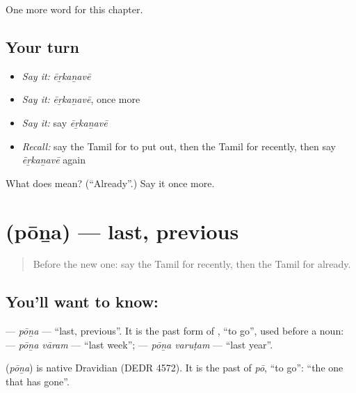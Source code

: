 \begin{grammarlens}[title={What you've built}]
One more word for this chapter.
\end{grammarlens}

\subsection*{Your turn}
\begin{itemize}
\raggedright
  \item \emph{Say it:} \emph{ēṟkaṉavē}
  \item \emph{Say it:} \emph{ēṟkaṉavē}, once more
  \item \emph{Say it:} say \emph{ēṟkaṉavē}
  \item \emph{Recall:} say the Tamil for to put out, then the Tamil for recently, then say \emph{ēṟkaṉavē} again
\end{itemize}

\begin{tcolorbox}[breakable,colback=teal!4,colframe=teal!35!black,title={Before you move on}]
What does  mean? (\textquotedblleft{}Already\textquotedblright{}.) Say it once more.
\end{tcolorbox}
\section[\texorpdfstring{\ta{போன} (pōṉa)}{போன (pōṉa)}]{ (pōṉa) — last, previous}

\label{lesson:TA-C158-pona}



\begin{quote}
Before the new one: say the Tamil for recently, then the Tamil for already.
\end{quote}

\subsection*{You'll want to know: }
\textbf{} — \emph{pōṉa} — \textquotedblleft{}last, previous\textquotedblright{}. It is the past form of \textbf{}, \textquotedblleft{}to go\textquotedblright{}, used before a noun: \textbf{ } — \emph{pōṉa vāram} — \textquotedblleft{}last week\textquotedblright{}; \textbf{ } — \emph{pōṉa varuṭam} — \textquotedblleft{}last year\textquotedblright{}.

\begin{cousinweb}
\textbf{} (\emph{pōṉa}) is native Dravidian (DEDR 4572). It is the past of \emph{pō}, \textquotedblleft{}to go\textquotedblright{}: \textquotedblleft{}the one that has gone\textquotedblright{}.
\end{cousinweb}

